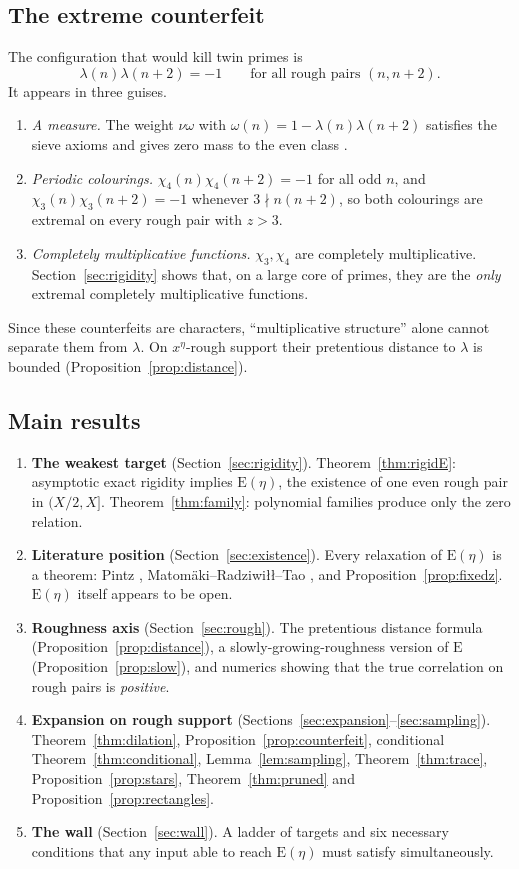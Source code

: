 \documentclass[11pt]{amsart}
\theoremstyle{definition}
\theoremstyle{remark}
\newcommand{\EE}{\mathrm E}
\begin{document}
\subsection{The extreme counterfeit}
The configuration that would kill twin primes is
\[
\lambda(n)\lambda(n+2)=-1\qquad\text{for all rough pairs }(n,n+2).
\]
It appears in three guises.
\begin{enumerate}
\item \emph{A measure.} The weight $\nu\omega$ with $\omega(n)=1-\lambda(n)\lambda(n+2)$ satisfies the sieve axioms and gives zero mass to the even class \cite[\S8]{Polymath8b}.
\item \emph{Periodic colourings.} $\chi_4(n)\chi_4(n+2)=-1$ for all odd $n$, and $\chi_3(n)\chi_3(n+2)=-1$ whenever $3\nmid n(n+2)$, so both colourings are extremal on every rough pair with $z>3$.
\item \emph{Completely multiplicative functions.} $\chi_3,\chi_4$ are completely multiplicative. Section~\ref{sec:rigidity} shows that, on a large core of primes, they are the \emph{only} extremal completely multiplicative functions.
\end{enumerate}
Since these counterfeits are characters, ``multiplicative structure'' alone cannot separate them from $\lambda$. On $x^\eta$-rough support their pretentious distance to $\lambda$ is bounded (Proposition~\ref{prop:distance}).

\subsection{Main results}
\begin{enumerate}
\item \textbf{The weakest target} (Section~\ref{sec:rigidity}). Theorem~\ref{thm:rigidE}: asymptotic exact rigidity implies $\EE(\eta)$, the existence of one even rough pair in $(X/2,X]$. Theorem~\ref{thm:family}: polynomial families produce only the zero relation.
\item \textbf{Literature position} (Section~\ref{sec:existence}). Every relaxation of $\EE(\eta)$ is a theorem: Pintz \cite{Pin10}, Matom\"aki--Radziwi\l{}\l{}--Tao \cite{MRT19}, and Proposition~\ref{prop:fixedz}. $\EE(\eta)$ itself appears to be open.
\item \textbf{Roughness axis} (Section~\ref{sec:rough}). The pretentious distance formula (Proposition~\ref{prop:distance}), a slowly-growing-roughness version of $\EE$ (Proposition~\ref{prop:slow}), and numerics showing that the true correlation on rough pairs is \emph{positive}.
\item \textbf{Expansion on rough support} (Sections~\ref{sec:expansion}--\ref{sec:sampling}). Theorem~\ref{thm:dilation}, Proposition~\ref{prop:counterfeit}, conditional Theorem~\ref{thm:conditional}, Lemma~\ref{lem:sampling}, Theorem~\ref{thm:trace}, Proposition~\ref{prop:stars}, Theorem~\ref{thm:pruned} and Proposition~\ref{prop:rectangles}.
\item \textbf{The wall} (Section~\ref{sec:wall}). A ladder of targets and six necessary conditions that any input able to reach $\EE(\eta)$ must satisfy simultaneously.
\end{enumerate}
\end{document}
